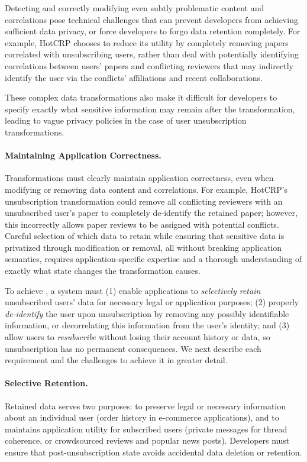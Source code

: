 Detecting and correctly modifying even subtly problematic content and correlations pose technical
challenges that can prevent developers from achieving sufficient data privacy, or force developers
to forgo data retention completely. For example, HotCRP chooses to reduce its utility by completely
removing papers correlated with unsubscribing users, rather than deal with potentially identifying
correlations between users' papers and conflicting reviewers that may indirectly identify the user
via the conflicts' affiliations and recent collaborations. 

These complex data transformations also make it difficult for developers to specify exactly what
sensitive information may remain after the transformation, leading to \eg vague privacy policies in
the case of user unsubscription transformations.

\paragraph{Maintaining Application Correctness.}
Transformations must clearly maintain application correctness, even when modifying or removing data
content and correlations. For example, HotCRP's unsubscription transformation could remove all
conflicting reviewers with an unsubscribed user's paper to completely de-identify the retained
paper; however, this incorrectly allows paper reviews to be assigned with potential conflicts.
Careful selection of which data to retain while ensuring that sensitive data is privatized through
modification or removal, all without breaking application semantics, requires application-specific
expertise and a thorough understanding of exactly what state changes the transformation causes.

\iffalse
To achieve \name, a system must (1) enable applications to \emph{selectively retain} unsubscribed
users' data for necessary legal or application purposes; (2) properly \emph{de-identify} the user
upon unsubscription by removing any possibly identifiable information, or decorrelating this
information from the user's identity; and (3) allow users to \emph{resubscribe} without losing their
account history or data, so unsubscription has no permanent consequences. We next describe each
requirement and the challenges to achieve it in greater detail.

\paragraph{Selective Retention.}
Retained data serves two purposes: to preserve legal or
necessary information about an individual user (\eg order history in e-commerce applications), and
to maintains application utility for subscribed users (\eg private messages
for thread coherence, or crowdsourced reviews and popular news posts).
Developers must ensure that post-unsubscription state avoids accidental data deletion or retention.

